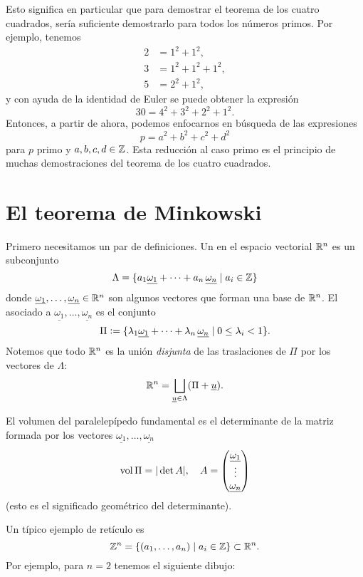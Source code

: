 \documentclass{article}
\numberwithin{equation}{section}
\begin{document}
Esto significa en particular que para demostrar el teorema de los cuatro
cuadrados, sería suficiente demostrarlo para todos los números primos. Por
ejemplo, tenemos
\begin{align*}
2 & = 1^2 + 1^2, \\
3 & = 1^2 + 1^2 + 1^2, \\
5 & = 2^2 + 1^2,
\end{align*}
y con ayuda de la identidad de Euler se puede obtener la expresión
$$30 = 4^2 + 3^2 + 2^2 + 1^2.$$
Entonces, a partir de ahora, podemos enfocarnos en búsqueda de las expresiones
$$p = a^2 + b^2 + c^2 + d^2$$
para $p$ primo y $a,b,c,d\in \mathbb{Z}$. Esta reducción al caso primo es el principio
de muchas demostraciones del teorema de los cuatro cuadrados.


\section{El teorema de Minkowski}

Primero necesitamos un par de definiciones. Un  en el espacio
vectorial $\mathbb{R}^n$ es un subconjunto
$$\Lambda = \{ a_1\underline{\omega_1} + \cdots + a_n\,\underline{\omega_n} \mid a_i \in \mathbb{Z} \}$$
donde $\underline{\omega_1}, \ldots, \underline{\omega_n} \in \mathbb{R}^n$ son algunos
vectores que forman una base de $\mathbb{R}^n$. El 
asociado a $\underline{\omega_1}, \ldots, \underline{\omega_n}$ es el conjunto
$$\Pi \mathrel{\mathop:}= \{ \lambda_1\underline{\omega_1} + \cdots + \lambda_n\,\underline{\omega_n} \mid 0 \le \lambda_i < 1 \}.$$
Notemos que todo $\mathbb{R}^n$ es la unión \emph{disjunta} de las traslaciones de
$\Pi$ por los vectores de $\Lambda$:
$$\mathbb{R}^n = \bigsqcup_{\underline{u}\in \Lambda} (\Pi + \underline{u}).$$

El volumen del paralelepípedo fundamental es el determinante de la matriz
formada por los vectores $\underline{\omega_1},\ldots,\underline{\omega_n}$
$$\operatorname{vol} \Pi = |\det A|, \quad A = \begin{pmatrix}
\underline{\omega_1} \\
\vdots \\
\underline{\omega_n}
\end{pmatrix}$$
(esto es el significado geométrico del determinante).

\vspace{1em}

Un típico ejemplo de retículo es
$$\mathbb{Z}^n = \{ (a_1,\ldots,a_n) \mid a_i \in \mathbb{Z} \} \subset \mathbb{R}^n.$$
Por ejemplo, para $n = 2$ tenemos el siguiente dibujo:
\end{document}
